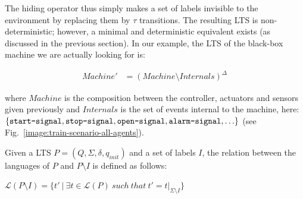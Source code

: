 The hiding operator thus simply makes a set of labels invisible to the environment by replacing them by $\tau$ transitions. The resulting LTS is non-deterministic; however, a minimal and deterministic equivalent exists (as discussed in the previous section). In our example, the LTS of the black-box machine we are actually looking for is:

\vspace{-0.8cm}
\begin{align*}
Machine' &= (Machine \setminus Internals)^\Delta
\end{align*}
\vspace{-0.8cm}

\noindent where $Machine$ is the composition between the controller, actuators and sensors given previously and $Internals$ is the set of events internal to the machine, here: $\{\texttt{start-signal}, \texttt{stop-signal}, \texttt{open-signal}, \texttt{alarm-signal}, \ldots\}$ (see Fig.~\ref{image:train-scenario-all-agents}).

Given a LTS $P = (Q,\Sigma,\delta,q_{init})$ and a set of labels $I$, the relation between the languages of $P$ and $P \setminus I$ is defined as follows:

\begin{center}
$\mathcal{L}(P \setminus I) = \{ t'~|~\exists t \in \mathcal{L}(P)~such~that~t' = t|_{\Sigma \setminus I}\}$
\end{center}

